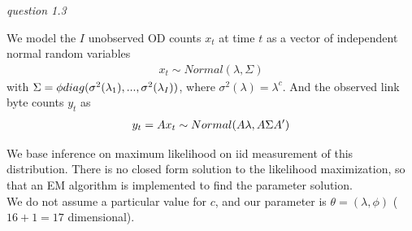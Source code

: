 \documentclass[twoside]{article}
\begin{document}
\vspace{.2 in}

\textit{question 1.3}

We model the $I$ unobserved OD counts $x_t$ at time $t$ as a vector of independent normal random variables
\begin{align*}
x_t \sim Normal(\lambda, \Sigma)
\end{align*}
with $\Sigma = \phi \* diag(\sigma^2(\lambda_1), ..., \sigma^2(\lambda_I))$, where $\sigma^2(\lambda) = \lambda^c$. And the observed link byte counts $y_t$ as
\begin{align*}
y_t = A \* x_t \sim Normal(A \* \lambda, A \* \Sigma A')
\end{align*}

We base inference on maximum likelihood on iid measurement of this distribution. There is no closed form solution to the likelihood maximization, so that an EM algorithm is implemented to find the parameter solution.\\

We do not assume a particular value for $c$, and our parameter is $\theta = \left(\lambda, \phi\right)$ ($16 + 1 = 17$ dimensional).\\
\end{document}
